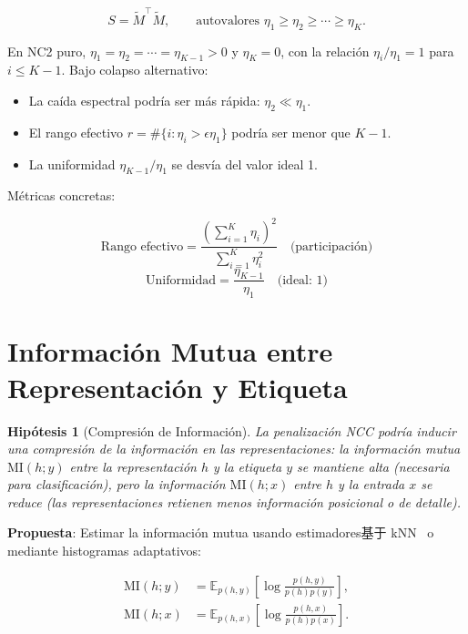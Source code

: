 \documentclass[12pt,a4paper]{report}
\newtheorem{hypothesis}{Hipótesis}[chapter]
\newcommand{\MI}{\text{MI}}
\begin{document}
\begin{equation}
    S = \tilde{M}^\top \tilde{M}, \qquad \text{autovalores } \eta_1 \geq \eta_2 \geq \cdots \geq \eta_K.
\end{equation}

En NC2 puro, $\eta_1 = \eta_2 = \cdots = \eta_{K-1} > 0$ y $\eta_K = 0$, con la relación $\eta_i / \eta_1 = 1$ para $i \leq K-1$. Bajo colapso alternativo:

\begin{itemize}
    \item La caída espectral podría ser más rápida: $\eta_2 \ll \eta_1$.
    \item El rango efectivo $r = \#\{i : \eta_i > \epsilon \eta_1\}$ podría ser menor que $K-1$.
    \item La uniformidad $\eta_{K-1}/\eta_1$ se desvía del valor ideal 1.
\end{itemize}

Métricas concretas:

\begin{equation}
    \text{Rango efectivo} = \frac{(\sum_{i=1}^{K} \eta_i)^2}{\sum_{i=1}^{K} \eta_i^2} \quad \text{(participación)}
\end{equation}
\begin{equation}
    \text{Uniformidad} = \frac{\eta_{K-1}}{\eta_1} \quad \text{(ideal: 1)}
\end{equation}

\section{Información Mutua entre Representación y Etiqueta}

\begin{hypothesis}[Compresión de Información]
La penalización NCC podría inducir una compresión de la información en las representaciones: la información mutua $\MI(h; y)$ entre la representación $h$ y la etiqueta $y$ se mantiene alta (necesaria para clasificación), pero la información $\MI(h; x)$ entre $h$ y la entrada $x$ se reduce (las representaciones retienen menos información posicional o de detalle).
\end{hypothesis}

\textbf{Propuesta}: Estimar la información mutua usando estimadores基于 kNN~\cite{kozachenko1987sample} o mediante histogramas adaptativos:

\begin{align}
    \MI(h; y) &= \mathbb{E}_{p(h,y)}\!\left[\log\frac{p(h,y)}{p(h)p(y)}\right], \\
    \MI(h; x) &= \mathbb{E}_{p(h,x)}\!\left[\log\frac{p(h,x)}{p(h)p(x)}\right].
\end{align}
\end{document}
